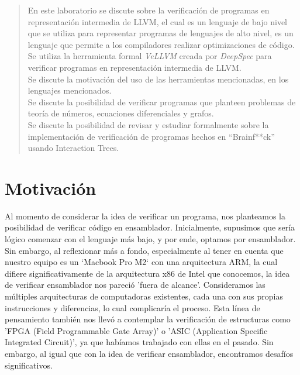 \documentclass{hw-template}
\begin{document}
\maketitle
\begin{abstract}
    En este laboratorio se discute sobre la verificación de programas en representación
    intermedia de LLVM, el cual es un lenguaje de bajo nivel que se utiliza para
    representar programas de lenguajes de alto nivel, es un lenguaje que permite
    a los compiladores realizar optimizaciones de código. \\
    Se utiliza la herramienta formal \textit{VeLLVM} creada por \textit{DeepSpec} para
    verificar programas en representación intermedia de LLVM. \\
    Se discute la motivación del uso de las herramientas mencionadas, en los lenguajes
    mencionados. \\ 
    Se discute la posibilidad de verificar programas que planteen problemas de teoría
    de números, ecuaciones diferenciales y grafos. \\
    Se discute la posibilidad de revisar y estudiar formalmente sobre la implementación
    de verificación de programas hechos en ``Brainf**ck'' usando Interaction Trees.
\end{abstract}

\tableofcontents

\clearpage

\section{Motivación}
Al momento de considerar la idea de verificar un programa, nos planteamos
la posibilidad de verificar código en ensamblador. Inicialmente, supusimos
que sería lógico comenzar con el lenguaje más bajo, y por ende, optamos
por ensamblador. Sin embargo, al reflexionar más a fondo, especialmente al
tener en cuenta que nuestro equipo es un `Macbook Pro M2` con una
arquitectura ARM, la cual difiere significativamente de la arquitectura x86
de Intel que conocemos, la idea de verificar ensamblador nos pareció 
'fuera de alcance'. Consideramos las múltiples arquitecturas de computadoras
existentes, cada una con sus propias instrucciones y diferencias, lo cual
complicaría el proceso. Esta línea de pensamiento también nos llevó a
contemplar la verificación de estructuras como 'FPGA (Field Programmable
Gate Array)' o 'ASIC (Application Specific Integrated Circuit)', ya que
habíamos trabajado con ellas en el pasado. Sin embargo, al igual que con
la idea de verificar ensamblador, encontramos desafíos significativos. \\
\end{document}
